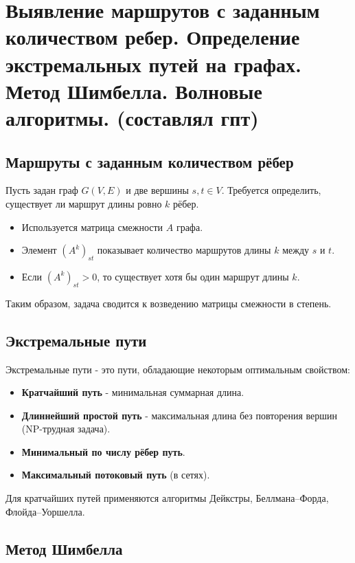 {
	\section{Выявление маршрутов с заданным количеством ребер. Определение
экстремальных путей на графах. Метод Шимбелла. Волновые алгоритмы. (составлял гпт)}

\subsection*{Маршруты с заданным количеством рёбер}

Пусть задан граф $G(V, E)$ и две вершины $s, t \in V$.  
Требуется определить, существует ли маршрут длины ровно $k$ рёбер.

\begin{itemize}
  \item Используется матрица смежности $A$ графа.
  \item Элемент $(A^k)_{st}$ показывает количество маршрутов длины $k$ между $s$ и $t$.
  \item Если $(A^k)_{st} > 0$, то существует хотя бы один маршрут длины $k$.
\end{itemize}

Таким образом, задача сводится к возведению матрицы смежности в степень.

\subsection*{Экстремальные пути}

Экстремальные пути - это пути, обладающие некоторым оптимальным свойством:

\begin{itemize}
  \item \textbf{Кратчайший путь} - минимальная суммарная длина.
  \item \textbf{Длиннейший простой путь} - максимальная длина без повторения вершин (NP-трудная задача).
  \item \textbf{Минимальный по числу рёбер путь}.
  \item \textbf{Максимальный потоковый путь} (в сетях).
\end{itemize}

Для кратчайших путей применяются алгоритмы Дейкстры, Беллмана–Форда, Флойда–Уоршелла.

\subsection*{Метод Шимбелла}

}
